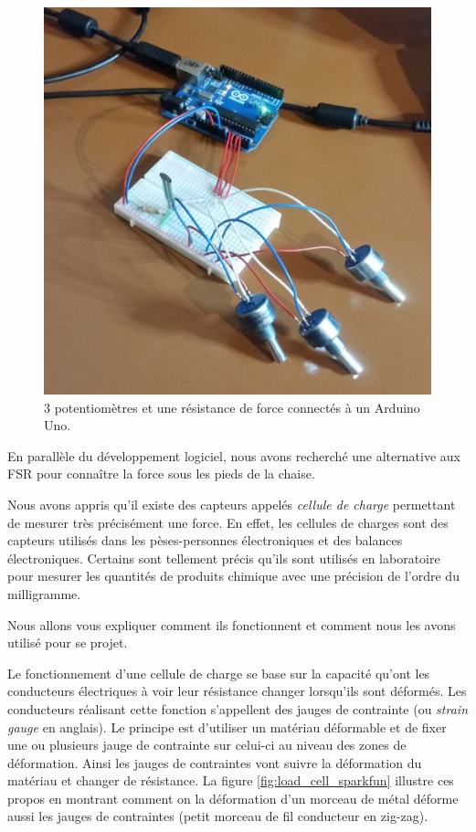 \documentclass{polytech/polytech}
\begin{document}
\begin{figure}[htbp]
\begin{center}
\includegraphics[scale=0.6]{image/Arduino_v0.jpg}
\end{center}
\caption{3 potentiomètres et une résistance de force connectés à un Arduino Uno.}
\label{fig:arduino_v0}
\end{figure}

En parallèle du développement logiciel, nous avons recherché une alternative aux FSR pour connaître la force sous les pieds de la chaise. 

Nous avons appris qu'il existe des capteurs appelés \textit{cellule de charge} permettant de mesurer très précisément une force. En effet, les cellules de charges sont des capteurs utilisés dans les pèses-personnes électroniques et des balances électroniques. Certains sont tellement précis qu'ils sont utilisés en laboratoire pour mesurer les quantités de produits chimique avec une précision de l'ordre du milligramme.

Nous allons vous expliquer comment ils fonctionnent et comment nous les avons utilisé pour se projet.

Le fonctionnement d'une cellule de charge se base sur la capacité qu'ont les conducteurs électriques à voir leur résistance changer lorsqu'ils sont déformés. Les conducteurs réalisant cette fonction s'appellent des jauges de contrainte (ou \textit{strain gauge} en anglais). Le principe est d'utiliser un matériau déformable et de fixer une ou plusieurs jauge de contrainte sur celui-ci au niveau des zones de déformation. Ainsi les jauges de contraintes vont suivre la déformation du matériau et changer de résistance. La figure \ref{fig:load_cell_sparkfun} illustre ces propos en montrant comment on la déformation d'un morceau de métal déforme aussi les jauges de contraintes (petit morceau de fil conducteur en zig-zag).
\end{document}
